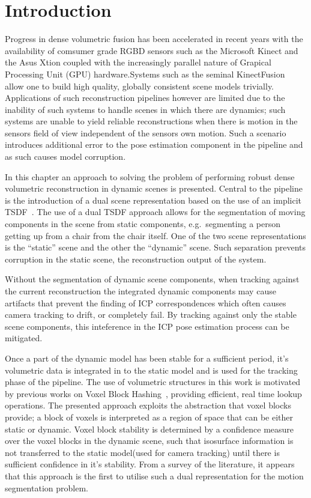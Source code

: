 \section{Introduction}
\label{sec: moseg_introduction}
Progress in dense volumetric fusion has been accelerated in recent years with
the availability of comsumer grade RGBD sensors such as the Microsoft Kinect and
the Asus Xtion coupled with the increasingly parallel nature of Grapical Processing 
Unit (GPU) hardware.Systems such as the seminal KinectFusion~\cite{Newcombe2011} 
allow one to build high quality, globally consistent scene models trivially. 
Applications of such reconstruction pipelines however are limited due to the 
inability of such systems to handle scenes in which there are dynamics; such 
systems are unable to yield reliable reconstructions when there is motion in the 
sensors field of view independent of the sensors own motion. Such a scenario introduces
additional error to the pose estimation component in the pipeline and as such
causes model corruption.

In this chapter an approach to solving the problem of performing robust
dense volumetric reconstruction in dynamic scenes is presented. Central to the
pipeline is the introduction of a dual scene representation based on the use
of an implicit TSDF~\cite{Curless1996}. The use of a dual TSDF approach allows
for the segmentation of moving components in the scene from static components,
e.g.\ segmenting a person getting up from a chair from the chair itself. One of
the two scene representations is the ``static'' scene and the other the
``dynamic'' scene. Such separation prevents corruption in the static scene,
the reconstruction output of the system.

Without the segmentation of dynamic scene components, when tracking against the
current reconstruction the integrated dynamic components may cause artifacts
that prevent the finding of ICP correspondences which often causes camera
tracking to drift, or completely fail. By tracking against only the stable
scene components, this inteference in the ICP pose estimation process can be
mitigated.

Once a part of the dynamic model has been stable for a sufficient period, it's
volumetric data is integrated in to the static model and is used for the
tracking phase of the pipeline. The use of volumetric structures in this work
is motivated by previous works on Voxel Block Hashing~\cite{NieBner2013},
providing efficient, real time lookup operations. The presented approach
exploits the abstraction that voxel blocks provide; a block of voxels is
interpreted as a region of space that can be either static or dynamic.
Voxel block stability is determined by a confidence measure over the voxel
blocks in the dynamic scene, such that isosurface information is not transferred
to the static model(used for camera tracking) until there is sufficient
confidence in it's stability. From a survey of the literature, it appears that 
this approach is the first to utilise such a dual representation for the motion 
segmentation problem.

